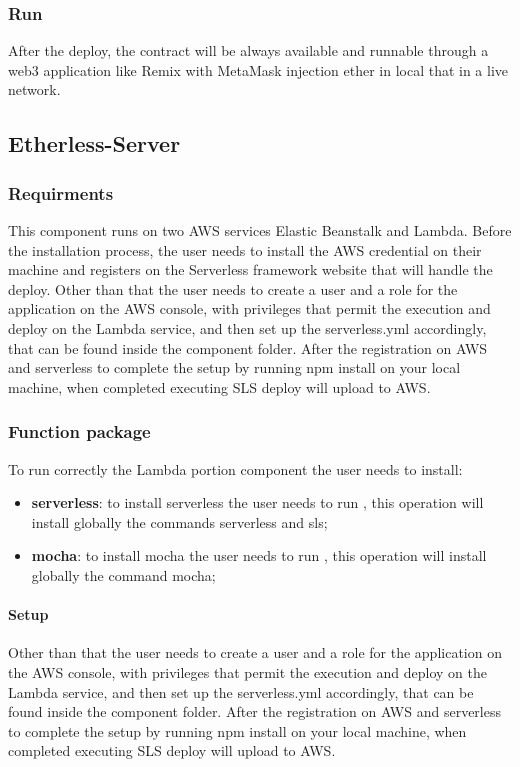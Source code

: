 \subsubsection{Run}
After the deploy, the contract will be always available and runnable through a web3 application like Remix with MetaMask injection ether in local that in a live network.
\subsection{Etherless-Server}
\subsubsection{Requirments}
This component runs on two AWS services Elastic Beanstalk and Lambda.
Before the installation process, the user needs to install the AWS credential on their
machine and registers on the Serverless framework website that will handle the deploy.
Other than that the user needs to create a user and a role for the application on the AWS console,
with privileges that permit the execution and deploy on the Lambda service, and then set up the serverless.yml accordingly,
that can be found inside the component folder.
After the registration on AWS and serverless to complete the setup by running npm install on your local machine, when completed executing SLS deploy will upload to AWS.
\subsubsection{Function package}
To run correctly the Lambda portion component the user needs to install:
\begin{itemize}
    \item \textbf{serverless}: to install serverless the user needs to run , this operation will install globally the commands serverless and sls;
    \item \textbf{mocha}: to install mocha the user needs to run , this operation will install globally the command mocha;
\end{itemize}
\paragraph{Setup}
Other than that the user needs to create a user and a role for the application on the AWS console,
with privileges that permit the execution and deploy on the Lambda service, and then set up the serverless.yml accordingly,
that can be found inside the component folder.
After the registration on AWS and serverless to complete the setup by running npm install on your local machine, when completed executing SLS deploy will upload to AWS.
